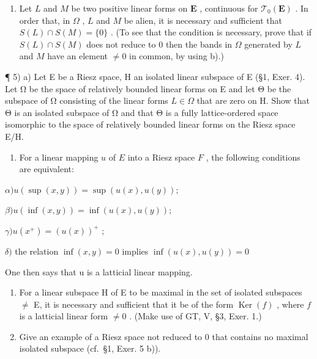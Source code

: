 \begin{enumerate}
\def\labelenumi{\alph{enumi})}
\setcounter{enumi}{2}
\tightlist
\item
  Let \(L\) and \(M\) be two positive linear forms on \(\mathbf{E}\) , continuous for \(\mathcal{T}_0(\mathbf{E})\) . In order that, in \(\Omega\) , \(L\) and \(M\) be alien, it is necessary and sufficient that \(S(L) \cap S(M) = \{0\}\) . (To see that the condition is necessary, prove that if \(S(L) \cap S(M)\) does not reduce to 0 then the bands in \(\Omega\) generated by \(L\) and \(M\) have an element \(\neq 0\) in common, by using b).)
\end{enumerate}

¶ 5) a) Let E be a Riesz space, H an isolated linear subspace of E (§1, Exer. 4). Let Ω be the space of relatively bounded linear forms on E and let Θ be the subspace of Ω consisting of the linear forms \(L \in \Omega\) that are zero on H. Show that Θ is an isolated subspace of Ω and that Θ is a fully lattice-ordered space isomorphic to the space of relatively bounded linear forms on the Riesz space E/H.

\begin{enumerate}
\def\labelenumi{\alph{enumi})}
\setcounter{enumi}{1}
\tightlist
\item
  For a linear mapping \(u\) of \(E\) into a Riesz space \(F\) , the following conditions are equivalent:
\end{enumerate}

\(\alpha) u(\sup(x, y)) = \sup(u(x), u(y));\)

\(\beta) u(\inf(x, y)) = \inf(u(x), u(y));\)

\(\gamma) u(x^{+}) = (u(x))^{+}\) ;

\(\delta)\) the relation \(\inf (x,y) = 0\) implies \(\inf (u(x),u(y)) = 0\)

One then says that u is a latticial linear mapping.

\begin{enumerate}
\def\labelenumi{\alph{enumi})}
\setcounter{enumi}{2}
\item
  For a linear subspace H of E to be maximal in the set of isolated subspaces \(\neq\) E, it is necessary and sufficient that it be of the form \(\operatorname{Ker}(f)\) , where \(f\) is a latticial linear form \(\neq 0\) . (Make use of GT, V, §3, Exer. 1.)
\item
  Give an example of a Riesz space not reduced to 0 that contains no maximal isolated subspace (cf.~§1, Exer. 5 b)).
\end{enumerate}

